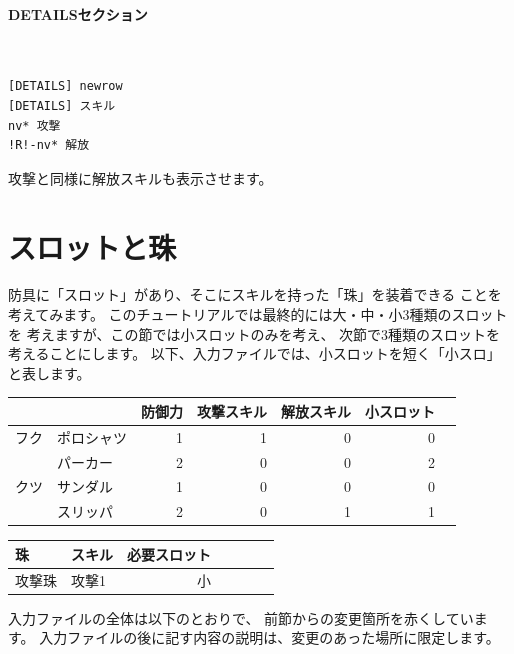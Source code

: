 \documentclass[dvipdfmx]{jsarticle}
\begin{document}
\paragraph{DETAILSセクション}~\medskip
{\footnotesize\begin{mdframed}\begin{Verbatim}[commandchars=!<>]
[DETAILS] newrow
[DETAILS] スキル
nv* 攻撃
!R!-nv* 解放
\end{Verbatim}
\end{mdframed}}
\medskip

攻撃と同様に解放スキルも表示させます。

\section{スロットと珠} %
防具に「スロット」があり、そこにスキルを持った「珠」を装着できる
ことを考えてみます。
%
このチュートリアルでは最終的には大・中・小3種類のスロットを
考えますが、この節では小スロットのみを考え、
次節で3種類のスロットを考えることにします。
%
以下、入力ファイルでは、小スロットを短く「小スロ」と表します。
%
\begin{center}
\begin{tabular}{llrrrrr}
\toprule
&& 防御力 & 攻撃スキル & 解放スキル & 小スロット\\
\midrule
フク
& ポロシャツ & 1 & 1 & 0 & 0\\
& パーカー   & 2 & 0 & 0 & 2\\
\midrule
クツ
& サンダル & 1 & 0 & 0 & 0\\
& スリッパ & 2 & 0 & 1 & 1\\
\bottomrule
\end{tabular}
\end{center}
%
\begin{center}
\begin{tabular}{llrrrrr}
\toprule
珠 & スキル & 必要スロット \\
\midrule
攻撃珠 & 攻撃1 & 小\\
\bottomrule
\end{tabular}
\end{center}
%
入力ファイルの全体は以下のとおりで、
前節からの変更箇所を赤くしています。
入力ファイルの後に記す内容の説明は、変更のあった場所に限定します。
\medskip
\end{document}
